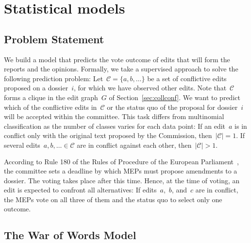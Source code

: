 \section{Statistical models}
\label{sec:models}


\subsection{Problem Statement}

We build a model that predicts the vote outcome of edits that will form the reports and the opinions.
Formally, we take a supervised approach to solve the following prediction problem:
Let~$\mathcal{C} = \{ a, b, \ldots \}$ be a set of conflictive edits proposed on a dossier~$i$, for which we have observed other edits.
Note that~$\mathcal{C}$ forms a clique in the edit graph~$G$ of Section~\ref{sec:collconf}.
We want to predict which of the conflictive edits in~$\mathcal{C}$ or the status quo of the proposal for dossier~$i$ will be accepted within the committee.
This task differs from multinomial classification as the number of classes varies for each data point:
If an edit~$a$ is in conflict only with the original text proposed by the Commission, then~$\vert \mathcal{C} \vert = 1$.
If several edits~$a, b, \ldots \in \mathcal{C}$ are in conflict against each other, then~$\vert \mathcal{C} \vert > 1$.

According to Rule 180 of the Rules of Procedure of the European Parliament~\cite{europarl2021rule180}, the committee sets a deadline by which MEPs must propose amendments to a dossier.
The voting takes place after this time.
Hence, at the time of voting, an edit is expected to confront all alternatives:
If edits~$a$,~$b$, and~$c$ are in conflict, the MEPs vote on all three of them and the status quo to select only one outcome.

\subsection{The War of Words Model}

